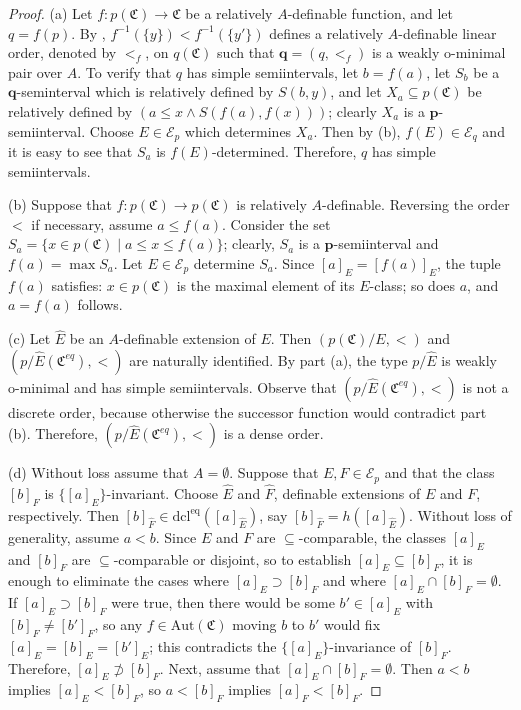 \documentclass{amsart}
\theoremstyle{definition}
\theoremstyle{definition}
\newcommand{\Mon}{\mathfrak C}
\newcommand{\Moneq}{\mathfrak C^{eq}}
\newcommand{\dcleq}{\mathrm{dcl^{eq}}}
\newcommand{\Aut}{\mathrm{Aut}}
\begin{document}
\begin{proof} (a) Let $f:p(\Mon)\to \Mon$ be a relatively $A$-definable function, and let $q=f(p)$. By \cite[Proposition 3.13(i)]{MTwom},  $f^{-1}(\{y\})<f^{-1}(\{y'\})$ defines a relatively $A$-definable linear order, denoted by $<_f$, on $q(\Mon)$ such that $\mathbf q=(q,<_f)$ is a weakly o-minimal pair over $A$. To verify that $q$ has simple semiintervals, let $b=f(a)$, let $S_b$ be a $\mathbf q$-seminterval which is relatively defined by $S(b,y)$, and let $X_a\subseteq p(\Mon)$ be relatively defined by $(a\leqslant x \land S(f(a),f(x)))$; clearly $X_a$ is a $\mathbf p$-semiinterval. Choose $E\in \mathcal E_p$ which determines $X_a$. Then by \cite[Proposition 2.13]{MTwom}(b),
$f(E)\in \mathcal E_q$ and it is easy to see that $S_a$ is $f(E)$-determined. 
Therefore, $q$ has simple semiintervals. 

(b) Suppose that $f:p(\Mon)\to p(\Mon)$ is relatively $A$-definable. Reversing the order $<$ if necessary, assume $a\leqslant f(a)$.
Consider the set $S_a=\{x\in p(\Mon)\mid a\leqslant x\leqslant f(a)\}$; clearly, $S_a$ is a $\mathbf p$-semiinterval and $f(a)=\max S_a$. Let $E\in\mathcal E_p$ determine $S_a$. Since $[a]_E=[f(a)]_E$, the tuple $f(a)$ satisfies: $x\in p(\Mon)$ is the maximal element of its $E$-class; so does $a$, and $a=f(a)$ follows.  

(c) Let $\hat E$ be an $A$-definable extension of $E$. Then $(p(\Mon)/E,<)$ and $(p/\hat E(\Moneq),<)$ are naturally identified. By part (a), the type $p/\hat E$ is weakly o-minimal and has simple semiintervals. Observe that $(p/\hat E(\Moneq),<)$ is not a discrete order, because otherwise the successor function would contradict part (b). Therefore, $(p/\hat E(\Moneq),<)$ is a dense order.

(d) Without loss assume that $A=\emptyset$. Suppose that $E,F\in \mathcal E_p$ and that the class $[b]_F$ is $\{[a]_E\}$-invariant. Choose $\hat E$ and $\hat F$, definable extensions of $E$ and $F$, respectively. Then $[b]_{\hat F}\in \dcleq([a]_{\hat E})$, say $[b]_{\hat F}=h([a]_{\hat E})$. Without loss of generality, assume $a<b$. Since $E$ and $F$ are $\subseteq$-comparable, the classes $[a]_E$ and $[b]_F$ are $\subseteq$-comparable or disjoint, so to establish $[a]_E\subseteq [b]_F$, it is enough to eliminate the cases where $[a]_E \supset [b]_F$ and where $[a]_E\cap [b]_F=\emptyset$. 
If $[a]_E\supset [b]_F$ were true, then there would be some $b'\in [a]_E$ with $[b]_F\neq [b']_F$, so any $f\in \Aut(\Mon)$ moving $b$ to $b'$ would fix $[a]_E=[b]_E=[b']_E$; this contradicts the $\{[a]_E\}$-invariance of $[b]_F$. Therefore, $[a]_E\nsupset [b]_F$.  
Next, assume that $[a]_E\cap [b]_F=\emptyset$. Then $a<b$ implies $[a]_E<[b]_F$, so $a<[b]_F$ implies $[a]_F<[b]_F$. 


\end{proof}
\end{document}
